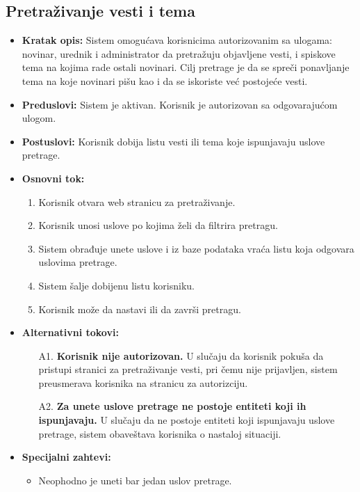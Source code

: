 \documentclass{article}
\begin{document}
\subsection{Pretraživanje vesti i tema}
\begin{itemize}
    \item \textbf{Kratak opis:} Sistem omogućava korisnicima autorizovanim sa ulogama: novinar, urednik i administrator da pretražuju objavljene vesti, i spiskove tema na kojima rade ostali novinari. Cilj pretrage je da se spreči ponavljanje tema na koje novinari pišu kao i da se iskoriste već postojeće vesti.  
    \item \textbf{Preduslovi:} Sistem je aktivan. Korisnik je autorizovan sa odgovarajućom ulogom. 
    \item \textbf{Postuslovi:} Korisnik dobija listu vesti ili tema koje ispunjavaju uslove pretrage.
    \item \textbf{Osnovni tok:}
        \begin{enumerate}
            \item Korisnik otvara web stranicu za pretraživanje.
            \item Korisnik unosi uslove po kojima želi da filtrira pretragu.
            \item Sistem obrađuje unete uslove i iz baze podataka vraća listu koja odgovara uslovima pretrage.
            \item Sistem šalje dobijenu listu korisniku.
            \item Korisnik može da nastavi ili da završi pretragu.
	    \end{enumerate}
    \item \textbf{Alternativni tokovi:}
        \begin{itemize}
            \item[A1.] \textbf{Korisnik nije autorizovan.} U slučaju da korisnik pokuša da pristupi stranici za pretraživanje vesti, pri čemu nije prijavljen, sistem preusmerava korisnika na stranicu za autorizciju.
            \item[A2.] \textbf{Za unete uslove pretrage ne postoje entiteti koji ih ispunjavaju.} U slučaju da ne postoje entiteti koji ispunjavaju uslove pretrage, sistem obaveštava korisnika o nastaloj situaciji.
        \end{itemize}
    \item \textbf{Specijalni zahtevi:}
        \begin{itemize}
			\item Neophodno je uneti bar jedan uslov pretrage.

\end{itemize}
\end{itemize}
\end{document}
